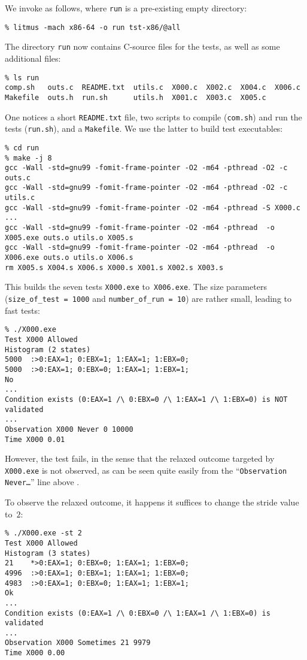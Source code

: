 We invoke \litmus{} as follows,
where \texttt{run} is a pre-existing empty directory:
\begin{verbatim}
% litmus -mach x86-64 -o run tst-x86/@all
\end{verbatim}
The directory \texttt{run} now contains C-source files for the tests,
as well as some additional files:
\begin{verbatim}
% ls run
comp.sh   outs.c  README.txt  utils.c  X000.c  X002.c  X004.c  X006.c
Makefile  outs.h  run.sh      utils.h  X001.c  X003.c  X005.c
\end{verbatim}
One notices a short \texttt{README.txt} file, two scripts to compile
(\texttt{com.sh}) and run the tests (\texttt{run.sh}), and a \texttt{Makefile}.
We use the latter to build test executables:
\begin{verbatim}
% cd run
% make -j 8
gcc -Wall -std=gnu99 -fomit-frame-pointer -O2 -m64 -pthread -O2 -c outs.c
gcc -Wall -std=gnu99 -fomit-frame-pointer -O2 -m64 -pthread -O2 -c utils.c
gcc -Wall -std=gnu99 -fomit-frame-pointer -O2 -m64 -pthread -S X000.c
...
gcc -Wall -std=gnu99 -fomit-frame-pointer -O2 -m64 -pthread  -o X005.exe outs.o utils.o X005.s
gcc -Wall -std=gnu99 -fomit-frame-pointer -O2 -m64 -pthread  -o X006.exe outs.o utils.o X006.s
rm X005.s X004.s X006.s X000.s X001.s X002.s X003.s
\end{verbatim}
This builds the seven tests \texttt{X000.exe} to~\texttt{X006.exe}.
The size parameters (\verb+size_of_test = 1000+ and
\verb+number_of_run = 10+) are rather small, leading to fast tests:
\begin{verbatim}
% ./X000.exe 
Test X000 Allowed
Histogram (2 states)
5000  :>0:EAX=1; 0:EBX=1; 1:EAX=1; 1:EBX=0;
5000  :>0:EAX=1; 0:EBX=0; 1:EAX=1; 1:EBX=1;
No
...
Condition exists (0:EAX=1 /\ 0:EBX=0 /\ 1:EAX=1 /\ 1:EBX=0) is NOT validated
...
Observation X000 Never 0 10000
Time X000 0.01
\end{verbatim}
However, the test fails, in the sense that the relaxed outcome targeted by
\texttt{X000.exe} is not observed, as can be seen quite easily from
the ``\texttt{Observation Never\ldots}'' line above .


To observe the relaxed outcome,
it happens it suffices to change the stride value to~$2$:
\begin{verbatim}
% ./X000.exe -st 2
Test X000 Allowed
Histogram (3 states)
21    *>0:EAX=1; 0:EBX=0; 1:EAX=1; 1:EBX=0;
4996  :>0:EAX=1; 0:EBX=1; 1:EAX=1; 1:EBX=0;
4983  :>0:EAX=1; 0:EBX=0; 1:EAX=1; 1:EBX=1;
Ok
...
Condition exists (0:EAX=1 /\ 0:EBX=0 /\ 1:EAX=1 /\ 1:EBX=0) is validated
...
Observation X000 Sometimes 21 9979
Time X000 0.00
\end{verbatim}

